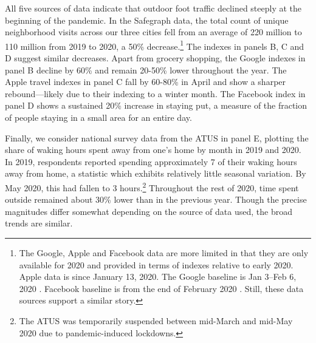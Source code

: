 \documentclass[12pt]{article}
\begin{document}
All five sources of data indicate that outdoor foot traffic declined steeply at the beginning of the pandemic. In the Safegraph data, the total count of unique neighborhood visits across our three cities fell from an average of 220 million to 110 million from 2019 to 2020, a 50\% decrease.\footnote{The Google, Apple and Facebook data are more limited in that they are only available for 2020 and provided in terms of indexes relative to early 2020. Apple data is since January 13, 2020. The Google baseline is Jan 3–Feb 6, 2020 \citep{google_data}. Facebook baseline is from the end of February 2020 \citep{facebook_documentation}. Still, these data sources support a similar story.} The indexes in panels B, C and D suggest similar decreases. Apart from grocery shopping, the Google indexes in panel B decline by 60\% and remain 20-50\% lower throughout the year. The Apple travel indexes in panel C  fall by 60-80\% in April and show a sharper rebound---likely due to their indexing to a winter month. The Facebook index in panel D shows a sustained 20\% increase in staying put, a measure of the fraction of people staying in a small area for an entire day.

Finally, we consider national survey data from the ATUS in panel E, plotting the share of waking hours spent away from one's home by month in 2019 and 2020. In 2019, respondents reported spending approximately 7 of their waking hours away from home, a statistic which exhibits relatively little seasonal variation. By May 2020, this had fallen to 3 hours.\footnote{The ATUS was temporarily suspended between mid-March and mid-May 2020 due to pandemic-induced lockdowns.} Throughout the rest of 2020, time spent outside remained about 30\% lower than in the previous year. Though the precise magnitudes differ somewhat depending on the source of data used, the broad trends are similar.
\end{document}
